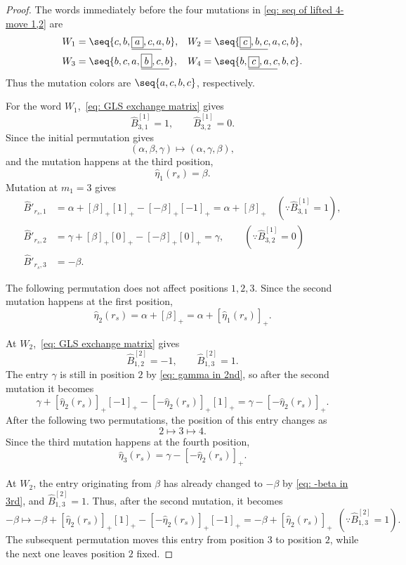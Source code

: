 \documentclass[12pt, leqno]{amsart}
\numberwithin{equation}{section}
\theoremstyle{plain}
\theoremstyle{definition}
\newcommand{\hB}{\widehat{B}}
\newcommand{\heta}{\widehat{\eta}}
\begin{document}
\begin{proof}
The words immediately before the four mutations 
in
\eqref{eq: seq of lifted 4-move 1,2} are
\begin{align*}
W_1&=\seq{c,b,\underline{\boxed{a},c,a},b},&
W_2&=\seq{\underline{\boxed{c},b,c},a,c,b},\allowdisplaybreaks\\
W_3&=\seq{b,c,a,\underline{\boxed{b},c,b}},&
W_4&=\seq{b,\underline{\boxed{c},a,c},b,c}.
\end{align*}
Thus the mutation colors are $\seq{a,c,b,c}$, respectively.

For the word 
$W_1$,~\eqref{eq: GLS exchange matrix} gives
\[
\hB^{[1]}_{3,1}=1, \qquad \hB^{[1]}_{3,2}=0.
\]
Since the initial permutation gives
\[
(\alpha,\beta,\gamma)
\longmapsto
(\alpha,\gamma,\boxed{\beta}),
\]
and the mutation happens at the third position,
\[
\heta_1(r_s)=\beta.
\]
Mutation at $m_1=3$ gives
\begin{align}
\hB'_{r_s,1} &= \alpha+[\beta]_+[1]_+ -[-\beta]_+[-1]_+ = \alpha+[\beta]_+ \quad (\because \hB^{[1]}_{3,1}=1), \nonumber\\
\hB'_{r_s,2} &= \gamma+[\beta]_+[0]_+ -[-\beta]_+[0]_+ = \gamma, \qquad (\because \hB^{[1]}_{3,2}=0) \label{eq: gamma in 2nd} \\
\hB'_{r_s,3} &=-\beta.  \label{eq: -beta in 3rd}
\end{align}

The following permutation does not affect positions $1,2,3$.
Since the second mutation happens at the first position,
\[
\heta_2(r_s) = \alpha+[\beta]_+ = \alpha+[\heta_1(r_s)]_+.
\]

At $W_2$,~\eqref{eq: GLS exchange matrix} gives
\[
\hB^{[2]}_{1,2}=-1, \qquad \hB^{[2]}_{1,3}=1.
\]
The entry $\gamma$ is still in position $2$ by
\eqref{eq: gamma in 2nd}, so after the second mutation it becomes
\[
\gamma+[\heta_2(r_s)]_+[-1]_+ -[-\heta_2(r_s)]_+[1]_+
= \gamma-[-\heta_2(r_s)]_+.
\]
After the following two permutations, the position of this entry changes as
\[
2\longmapsto3\longmapsto4.
\]
Since the third mutation happens at the fourth position,
\[
\heta_3(r_s) = \gamma-[-\heta_2(r_s)]_+.
\]

At $W_2$, the entry originating from $\beta$ has already changed to
$-\beta$ by \eqref{eq: -beta in 3rd}, and
$\hB^{[2]}_{1,3}=1$.
Thus, after the second mutation, it becomes
\[
-\beta \longmapsto -\beta+[\heta_2(r_s)]_+[1]_+ -[-\heta_2(r_s)]_+[-1]_+ = -\beta+[\heta_2(r_s)]_+ \ \ (\because \hB^{[2]}_{1,3}=1).
\]
The subsequent permutation moves this entry from position $3$
to position $2$, while the next one leaves position $2$ fixed.


\end{proof}
\end{document}
